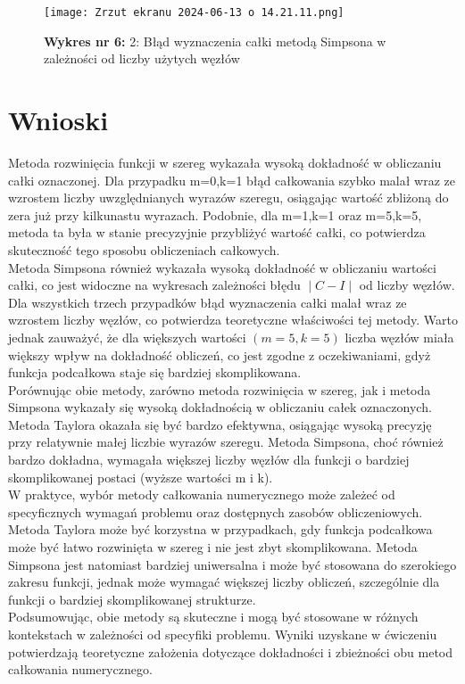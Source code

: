 \documentclass{article}
\begin{document}
\begin{figure}[H]
    \centering
    \texttt{[image: Zrzut ekranu 2024-06-13 o 14.21.11.png]}
    \caption{\textbf{Wykres nr 6:} 2: Błąd wyznaczenia całki metodą Simpsona w zależności od liczby użytych węzłów}
    \label{fig:enter-label}
\end{figure}

\section{Wnioski}
Metoda rozwinięcia funkcji w szereg wykazała wysoką dokładność w obliczaniu całki oznaczonej. Dla przypadku m=0,k=1 błąd całkowania szybko malał wraz ze wzrostem liczby uwzględnianych wyrazów szeregu, osiągając wartość zbliżoną do zera już przy kilkunastu wyrazach. Podobnie, dla  m=1,k=1 oraz m=5,k=5, metoda ta była w stanie precyzyjnie przybliżyć wartość całki, co potwierdza skuteczność tego sposobu obliczeniach całkowych.\\
\noindent
Metoda Simpsona również wykazała wysoką dokładność w obliczaniu wartości całki, co jest widoczne na wykresach zależności błędu $∣C-I∣$ od liczby węzłów. Dla wszystkich trzech przypadków błąd wyznaczenia całki malał wraz ze wzrostem liczby węzłów, co potwierdza teoretyczne właściwości tej metody. Warto jednak zauważyć, że dla większych wartości $(m=5,k=5)$ liczba węzłów miała większy wpływ na dokładność obliczeń, co jest zgodne z oczekiwaniami, gdyż funkcja podcałkowa staje się bardziej skomplikowana.
\\
\noindent
Porównując obie metody, zarówno metoda rozwinięcia w szereg, jak i metoda Simpsona wykazały się wysoką dokładnością w obliczaniu całek oznaczonych. Metoda Taylora okazała się być bardzo efektywna, osiągając wysoką precyzję przy relatywnie małej liczbie wyrazów szeregu. Metoda Simpsona, choć również bardzo dokładna, wymagała większej liczby węzłów dla funkcji o bardziej skomplikowanej postaci (wyższe wartości m i k).
\\
\noindent
W praktyce, wybór metody całkowania numerycznego może zależeć od specyficznych wymagań problemu oraz dostępnych zasobów obliczeniowych. Metoda Taylora może być korzystna w przypadkach, gdy funkcja podcałkowa może być łatwo rozwinięta w szereg i nie jest zbyt skomplikowana. Metoda Simpsona jest natomiast bardziej uniwersalna i może być stosowana do szerokiego zakresu funkcji, jednak może wymagać większej liczby obliczeń, szczególnie dla funkcji o bardziej skomplikowanej strukturze.
\\
\noindent
Podsumowując, obie metody są skuteczne i mogą być stosowane w różnych kontekstach w zależności od specyfiki problemu. Wyniki uzyskane w ćwiczeniu potwierdzają teoretyczne założenia dotyczące dokładności i zbieżności obu metod całkowania numerycznego. 
\end{document}
